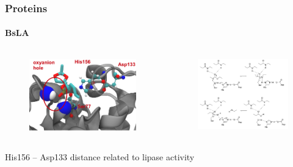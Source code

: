 \documentclass[english]{beamer}
\begin{document}

\begin{frame}
    \frametitle{Proteins}
    \framesubtitle{BsLA}

    \begin{columns}[t]
        \begin{figure}
            \includegraphics[width=1.0\textwidth]{figures/BSLA_pocket/BSLA_pocket_cartoon.pdf}
        \end{figure}      

        \begin{figure}
            \includegraphics[width=1.0\textwidth]{figures/BSLA_reaction.png}
        \end{figure}     

    \end{columns} 

    \centering
    His156 -- Asp133 distance related to lipase activity

\end{frame}  
\end{document}
